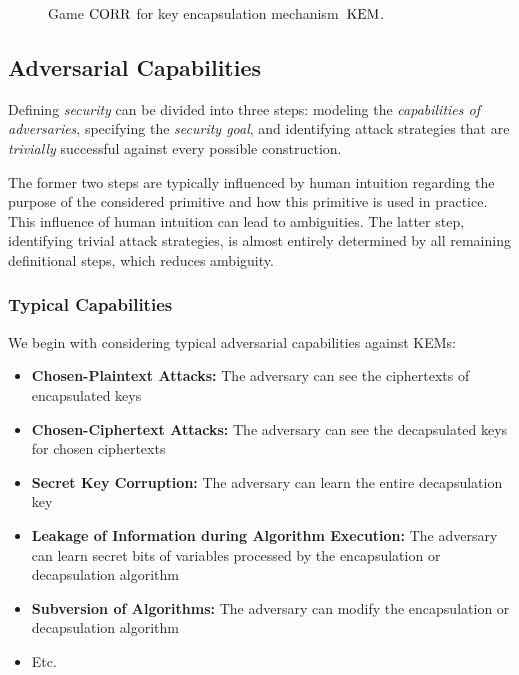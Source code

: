 \begin{figure}[!ht]
    \centering
    \nicoresetlinenr%
    \fbox{%
        \scalebox{\codescalefactor}{%
        }%
    }
    \caption{%
        Game $\mathrm{CORR}$ for key encapsulation mechanism~$\mathrm{KEM}$.
    }
    \label{fig:kem:corr}
\end{figure}

\subsection{Adversarial Capabilities}
Defining \emph{security} can be divided into three steps:
modeling the \emph{capabilities of adversaries},
specifying the \emph{security goal}, and
identifying attack strategies that are \emph{trivially} successful against every possible construction.

The former two steps are typically influenced by human intuition regarding the purpose of the considered primitive and how this primitive is used in practice.
This influence of human intuition can lead to ambiguities.
The latter step, identifying trivial attack strategies, is almost entirely determined by all remaining definitional steps, which reduces ambiguity.

\subsubsection{Typical Capabilities}
We begin with considering typical adversarial capabilities against KEMs:
\begin{itemize}
    \item \textbf{Chosen-Plaintext Attacks:}
    The adversary can see the ciphertexts of encapsulated keys
    \item \textbf{Chosen-Ciphertext Attacks:}
    The adversary can see the decapsulated keys for chosen ciphertexts
    \item \textbf{Secret Key Corruption:}
    The adversary can learn the entire decapsulation key
    \item \textbf{Leakage of Information during Algorithm Execution:}
    The adversary can learn secret bits of variables processed by the encapsulation or decapsulation algorithm
    \item \textbf{Subversion of Algorithms:}
    The adversary can modify the encapsulation or decapsulation algorithm
    \item Etc.
\end{itemize}

